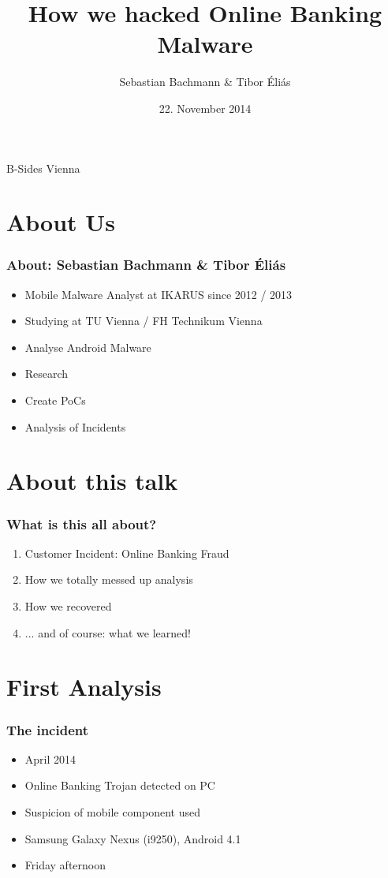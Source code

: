 \documentclass[12pt,a4paper]{beamer}
\author{Sebastian Bachmann \& Tibor Éliás}
\title{How we hacked Online Banking Malware}
\date{22. November 2014}
\begin{document}
\begin{frame}
    \maketitle
    \centering
    B-Sides Vienna
\end{frame}


\section{About Us}
\begin{frame}
	\frametitle{About: Sebastian Bachmann \& Tibor Éliás}
	\begin{itemize}
		\item Mobile Malware Analyst at IKARUS since 2012 / 2013
        \item Studying at TU Vienna / FH Technikum Vienna
		\item Analyse Android Malware
		\item Research
		\item Create PoCs
		\item Analysis of Incidents
	\end{itemize}
\end{frame}

\section{About this talk}
\begin{frame}
	\frametitle{What is this all about?}
	\begin{enumerate}
	
		\item Customer Incident: Online Banking Fraud
		\item How we totally messed up analysis
		\item How we recovered
		\item ... and of course: what we learned!
	\end{enumerate}
\end{frame}


\section{First Analysis}

\begin{frame}
	\frametitle{The incident}
	
	\begin{itemize}
		\item April 2014
		\item Online Banking Trojan detected on PC
		\item Suspicion of mobile component used
		\item Samsung Galaxy Nexus (i9250), Android 4.1
		\item Friday afternoon
	\end{itemize}

\end{frame}
\end{document}
